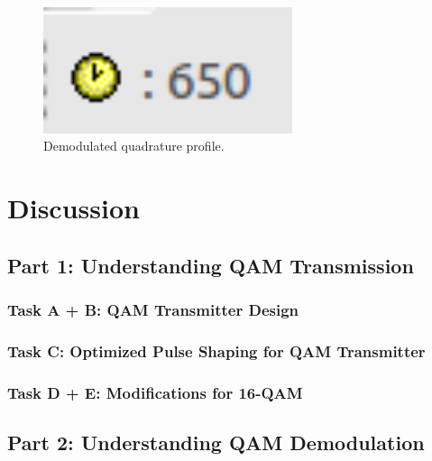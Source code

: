 \documentclass{article}
\begin{document}
\begin{figure}[h]
  \begin{center}
    \includegraphics[width=0.65\textwidth]{img/task_2_c_profile.png}
    \caption{Demodulated quadrature profile.}
  \end{center}
\end{figure}

\pagebreak


\section{Discussion}

\subsection{Part 1: Understanding QAM Transmission}

\subsubsection{Task A + B: QAM Transmitter Design}

\subsubsection{Task C: Optimized Pulse Shaping for QAM Transmitter}

\subsubsection{Task D + E: Modifications for 16-QAM}

\subsection{Part 2: Understanding QAM Demodulation}
\end{document}
